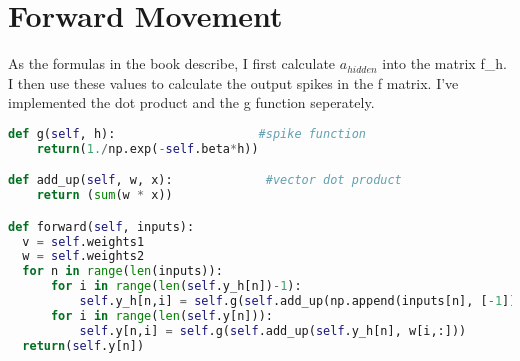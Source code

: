 \documentclass[10pt, a4paper]{article}
\begin{document}
\clearpage
\section{Forward Movement}
As the formulas in the book describe, I first calculate $a_{hidden}$ into the matrix f\_h. I then use these values to calculate the output spikes in the f matrix. 
I've implemented the dot product and the g function seperately.

\begin{lstlisting}[language = Python]
def g(self, h):                    #spike function
    return(1./np.exp(-self.beta*h))

def add_up(self, w, x):             #vector dot product
    return (sum(w * x))

def forward(self, inputs):
  v = self.weights1
  w = self.weights2
  for n in range(len(inputs)):
      for i in range(len(self.y_h[n])-1):
          self.y_h[n,i] = self.g(self.add_up(np.append(inputs[n], [-1]),v[i,:]))
      for i in range(len(self.y[n])):
          self.y[n,i] = self.g(self.add_up(self.y_h[n], w[i,:]))
  return(self.y[n])
\end{lstlisting}
\end{document}

